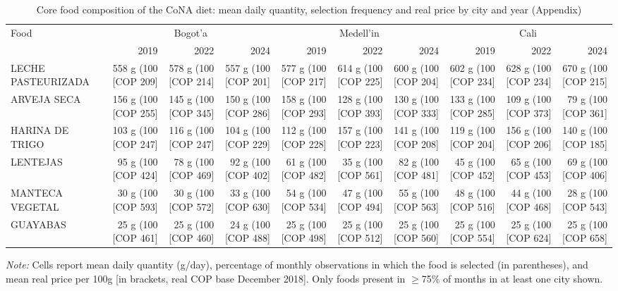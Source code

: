 \begin{table}[htbp]
\centering\small\setlength{\tabcolsep}{3pt}
\caption{Core food composition of the CoNA diet: mean daily quantity, selection frequency and real price by city and year (Appendix)}
\label{tab:cona_composition}
\begin{tabular}{lrrrrrrrrr}
\toprule
Food & \multicolumn{3}{c}{Bogot'{a}} & \multicolumn{3}{c}{Medell'{i}n} & \multicolumn{3}{c}{Cali} \\
 & 2019 & 2022 & 2024 & 2019 & 2022 & 2024 & 2019 & 2022 & 2024 \\
\addlinespace[2pt]
\midrule
LECHE PASTEURIZADA & 558 g (100%
[COP 209] & 578 g (100%
[COP 214] & 557 g (100%
[COP 201] & 577 g (100%
[COP 217] & 614 g (100%
[COP 225] & 600 g (100%
[COP 204] & 602 g (100%
[COP 234] & 628 g (100%
[COP 234] & 670 g (100%
[COP 215] \\
ARVEJA SECA & 156 g (100%
[COP 255] & 145 g (100%
[COP 345] & 150 g (100%
[COP 286] & 158 g (100%
[COP 293] & 128 g (100%
[COP 393] & 130 g (100%
[COP 333] & 133 g (100%
[COP 285] & 109 g (100%
[COP 373] & 79 g (100%
[COP 361] \\
HARINA DE TRIGO & 103 g (100%
[COP 247] & 116 g (100%
[COP 247] & 104 g (100%
[COP 229] & 112 g (100%
[COP 228] & 157 g (100%
[COP 223] & 141 g (100%
[COP 208] & 119 g (100%
[COP 204] & 156 g (100%
[COP 206] & 140 g (100%
[COP 185] \\
LENTEJAS & 95 g (100%
[COP 424] & 78 g (100%
[COP 469] & 92 g (100%
[COP 402] & 61 g (100%
[COP 482] & 35 g (100%
[COP 561] & 82 g (100%
[COP 481] & 45 g (100%
[COP 452] & 65 g (100%
[COP 453] & 69 g (100%
[COP 406] \\
MANTECA VEGETAL & 30 g (100%
[COP 593] & 30 g (100%
[COP 572] & 33 g (100%
[COP 630] & 54 g (100%
[COP 534] & 47 g (100%
[COP 494] & 55 g (100%
[COP 563] & 48 g (100%
[COP 516] & 44 g (100%
[COP 468] & 28 g (100%
[COP 543] \\
GUAYABAS & 25 g (100%
[COP 461] & 25 g (100%
[COP 460] & 24 g (100%
[COP 488] & 25 g (100%
[COP 498] & 25 g (100%
[COP 512] & 25 g (100%
[COP 560] & 25 g (100%
[COP 554] & 25 g (100%
[COP 624] & 25 g (100%
[COP 658] \\
\bottomrule
\end{tabular}
\begin{minipage}{\linewidth}
\vspace{2pt}\footnotesize
\textit{Note:} Cells report mean daily quantity (g/day), percentage of monthly observations in which the food is selected (in parentheses), and mean real price per 100g [in brackets, real COP base December 2018]. Only foods present in $\geq$75\% of months in at least one city shown.
\end{minipage}
\end{table}
